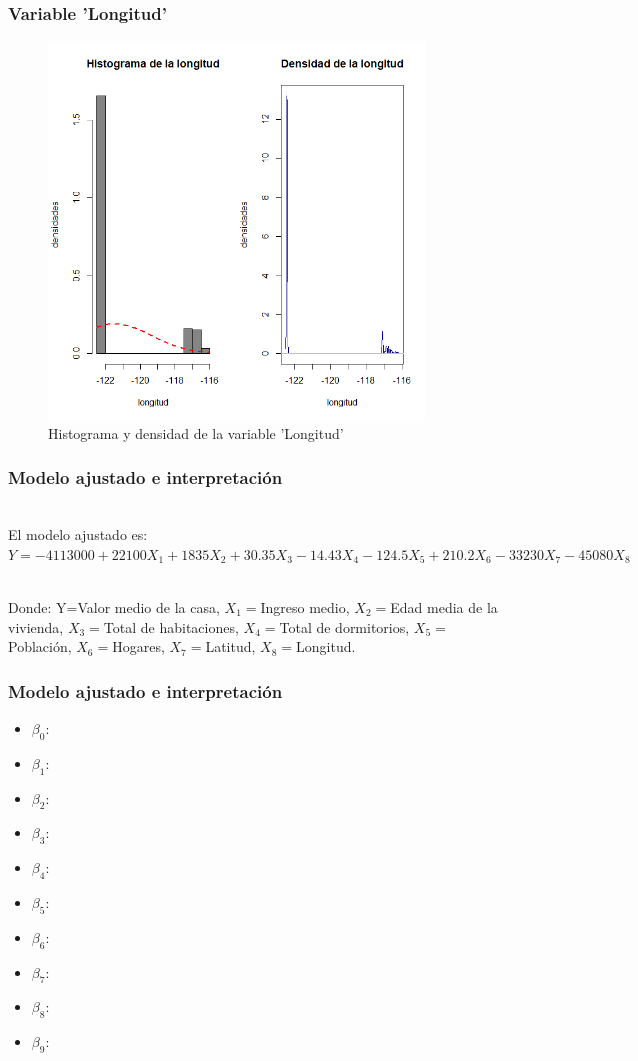 \documentclass[12pt]{beamer}
\begin{document}
\begin{frame}
\frametitle{Variable 'Longitud'}
\begin{figure}[!h]
    \begin{center}
        \includegraphics[width=10cm]{imagenes/9.png}
        \caption{Histograma y densidad de la variable 'Longitud'}
        \label{fig:Densidad}
    \end{center}
\end{figure}
\end{frame}
\begin{frame}
\frametitle{Modelo ajustado e interpretación}
~\\ El modelo ajustado es:
~\\ $Y=-4113000+22100 X_{1}+1835 X_{2}+30.35 X_{3}-14.43 X_{4}-
124.5 X_{5}+210.2 X_{6}-
33230 X_{7}-45080 X_{8}$

~\\ Donde: Y=Valor medio de la casa, $X_{1}=$Ingreso medio, $X_{2}=$Edad media de la vivienda, $X_{3}=$Total de habitaciones, $X_{4}=$Total de dormitorios, $X_{5}=$Población, $X_{6}=$Hogares, $X_{7}=$Latitud, $X_{8}=$Longitud.
\end{frame}

\begin{frame}
\frametitle{Modelo ajustado e interpretación}
\begin{itemize}
\item $\beta_{0}$:
\item $\beta_{1}$:
\item $\beta_{2}$:
\item $\beta_{3}$:
\item $\beta_{4}$:
\item $\beta_{5}$:
\item $\beta_{6}$:
\item $\beta_{7}$:
\item $\beta_{8}$:
\item $\beta_{9}$:
\end{itemize}
\end{frame}
\end{document}
